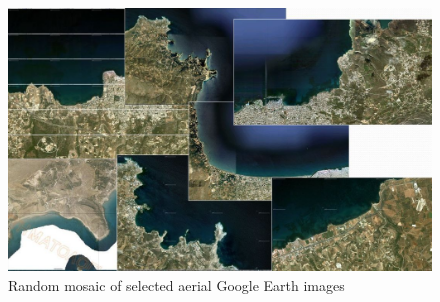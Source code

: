 \documentclass[10pt, a4paper]{article}
\begin{document}
\begin{appendices}
\begin{figure}[H]
\begin{center}
\includegraphics[scale=0.25]{App-8.jpg}
\caption{Random mosaic of selected aerial Google Earth images}
\label{fig:60}
\end{center}
\end{figure}
\pagebreak


\end{appendices}
\end{document}
